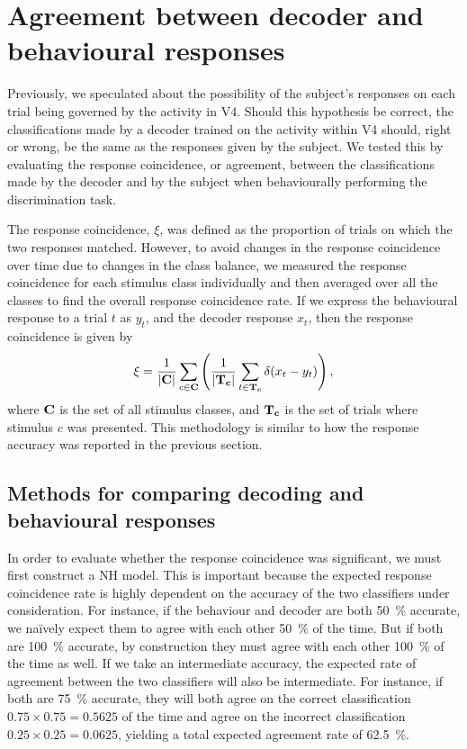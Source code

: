 \section{Agreement between decoder and behavioural responses}
\label{sec:pl_agreement}

Previously, we speculated about the possibility of the subject's responses on each trial being governed by the activity in \ac{V4}.
Should this hypothesis be correct, the classifications made by a decoder trained on the activity within \ac{V4} should, right or wrong, be the same as the responses given by the subject.
We tested this by evaluating the response coincidence, or agreement, between the classifications made by the decoder and by the subject when behaviourally performing the discrimination task.

The response coincidence, $\xi$, was defined as the proportion of trials on which the two responses matched.
However, to avoid changes in the response coincidence over time due to changes in the class balance, we measured the response coincidence for each stimulus class individually and then averaged over all the classes to find the overall response coincidence rate.
If we express the behavioural response to a trial $t$ as $y_t$, and the decoder response $x_t$, then the response coincidence is given by
\begin{equation}
\label{eq:agreement}
\xi = \frac{1}{|\mathbf{C}|} \sum_{c \in \mathbf{C}} \left( \frac{1}{|\mathbf{T_c}|} \sum_{t \in \mathbf{T_c}} \delta(x_t - y_t) \right)
,\end{equation}
where $\mathbf{C}$ is the set of all stimulus classes, and $\mathbf{T_c}$ is the set of trials where stimulus $c$ was presented.
This methodology is similar to how the response accuracy was reported in the previous section.


\subsection{Methods for comparing decoding and behavioural responses}
\label{sec:dec-meth-prob}

In order to evaluate whether the response coincidence was significant, we must first construct a \acf{NH} model.
This is important because the expected response coincidence rate is highly dependent on the accuracy of the two classifiers under consideration.
For instance, if the behaviour and decoder are both \SI{50}{\percent} accurate, we na\"ively expect them to agree with each other \SI{50}{\percent} of the time.
But if both are \SI{100}{\percent} accurate, by construction they must agree with each other \SI{100}{\percent} of the time as well.
If we take an intermediate accuracy, the expected rate of agreement between the two classifiers will also be intermediate.
For instance, if both are \SI{75}{\percent} accurate, they will both agree on the correct classification $0.75 \times 0.75 = 0.5625$ of the time and agree on the incorrect classification $0.25 \times 0.25 = 0.0625$, yielding a total expected agreement rate of \SI{62.5}{\percent}.

